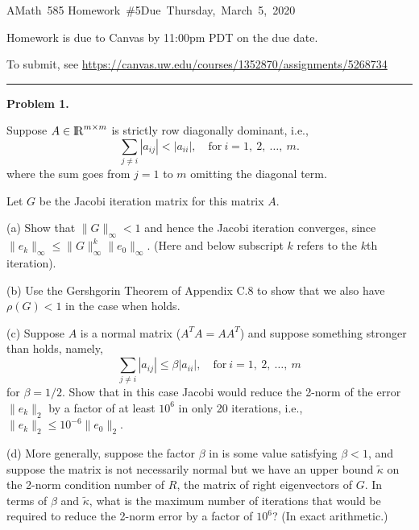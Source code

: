 \documentclass[10pt]{article}
\begin{document}
\hfill\vbox{\hbox{AMath 585}
\hbox{Homework \#5}\hbox{Due Thursday, March 5, 2020}}

\vskip 5pt

Homework is due to Canvas by 11:00pm PDT on the due date.

To submit, see
\url{https://canvas.uw.edu/courses/1352870/assignments/5268734}


\vskip 1cm
\hrule
{\bf Problem 1.}

Suppose $A \in {{\rm l} \kern -.15em {\rm R} }^{m\times m}$ is strictly row diagonally dominant,
i.e.,
\begin{equation}\label{diagdom}
\sum_{j\neq i} |a_{ij}| < |a_{ii}|, \quad\text{for}~i=1,~2,~\ldots,~m.
\end{equation} 
where the sum goes from $j=1$ to $m$ omitting the diagonal term.

Let $G$ be the Jacobi iteration matrix for this matrix $A$.

(a) Show that $\|G\|_\infty < 1$ and hence the Jacobi iteration converges,
since $\|e_k\|_\infty \leq \|G\|_\infty^k \|e_0\|_\infty$.  (Here and below
subscript $k$ refers to the $k$th iteration).

(b) Use the Gershgorin Theorem of Appendix C.8 to show that we also have
$\rho(G) < 1$ in the case when  holds.

(c) Suppose $A$ is a normal matrix ($A^TA = AA^T$) and suppose something
stronger than  holds, namely,
\begin{equation}\label{diagdom2}
\sum_{j\neq i} |a_{ij}| \leq \beta |a_{ii}|, \quad\text{for}~i=1,~2,~\ldots,~m
\end{equation} 
for $\beta = 1/2$.
Show that in this case Jacobi would reduce the 2-norm of the error
$\|e_k\|_2$ by a factor of at least $10^6$ in only 20 iterations, i.e., 
$\|e_k\|_2 \leq 10^{-6}\|e_0\|_2.$


(d) More generally, suppose the factor $\beta$ in 
is some value satisfying $\beta < 1$, and suppose the matrix is not
necessarily normal but we have an upper bound $\tilde \kappa$ on
the 2-norm condition number of $R$, the matrix of right eigenvectors
of $G$.  In terms of $\beta$ and $\tilde \kappa$, what is the maximum
number of iterations that would be required to reduce the 2-norm
error by a factor of $10^6$?  (In exact arithmetic.)

\end{document}

